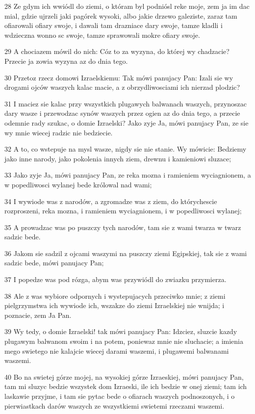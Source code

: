 \par 28 Ze gdym ich wwiódl do ziemi, o któram byl podniósl reke moje, zem ja im dac mial, gdzie ujrzeli jaki pagórek wysoki, albo jakie drzewo galeziste, zaraz tam ofiarowali ofiary swoje, i dawali tam drazniace dary swoje, tamze kladli i wdzieczna wonno sc swoje, tamze sprawowali mokre ofiary swoje.
\par 29 A chociazem mówil do nich: Cóz to za wyzyna, do której wy chadzacie? Przecie ja zowia wyzyna az do dnia tego.
\par 30 Przetoz rzecz domowi Izraelskiemu: Tak mówi panujacy Pan: Izali sie wy drogami ojców waszych kalac macie, a z obrzydliwosciami ich nierzad plodzic?
\par 31 I maciez sie kalac przy wszystkich plugawych balwanach waszych, przynoszac dary wasze i przewodzac synów waszych przez ogien az do dnia tego, a przecie odemnie rady szukac, o domie Izraelski? Jako zyje Ja, mówi panujacy Pan, ze sie wy mnie wiecej radzic nie bedziecie.
\par 32 A to, co wstepuje na mysl wasze, nigdy sie nie stanie. Wy mówicie: Bedziemy jako inne narody, jako pokolenia innych ziem, drewnu i kamieniowi sluzace;
\par 33 Jako zyje Ja, mówi panujacy Pan, ze reka mozna i ramieniem wyciagnionem, a w popedliwosci wylanej bede królowal nad wami;
\par 34 I wywiode was z narodów, a zgromadze was z ziem, do którychescie rozproszeni, reka mozna, i ramieniem wyciagnionem, i w popedliwosci wylanej;
\par 35 A prowadzac was po puszczy tych narodów, tam sie z wami twarza w twarz sadzic bede.
\par 36 Jakom sie sadzil z ojcami waszymi na puszczy ziemi Egipskiej, tak sie z wami sadzic bede, mówi panujacy Pan;
\par 37 I popedze was pod rózga, abym was przywiódl do zwiazku przymierza.
\par 38 Ale z was wybiore odpornych i wystepujacych przeciwko mnie; z ziemi pielgrzymstwa ich wywiode ich, wszakze do ziemi Izraelskiej nie wnijda; i poznacie, zem Ja Pan.
\par 39 Wy tedy, o domie Izraelski! tak mówi panujacy Pan: Idzciez, sluzcie kazdy plugawym balwanom swoim i na potem, poniewaz mnie nie sluchacie; a imienia mego swietego nie kalajcie wiecej darami waszemi, i plugawemi balwanami waszemi.
\par 40 Bo na swietej górze mojej, na wysokiej górze Izraeskiej, mówi panujacy Pan, tam mi sluzyc bedzie wszystek dom Izraeski, ile ich bedzie w onej ziemi; tam ich laskawie przyjme, i tam sie pytac bede o ofiarach waszych podnoszonych, i o pierwiastkach darów waszych ze wszystkiemi swietemi rzeczami waszemi.
